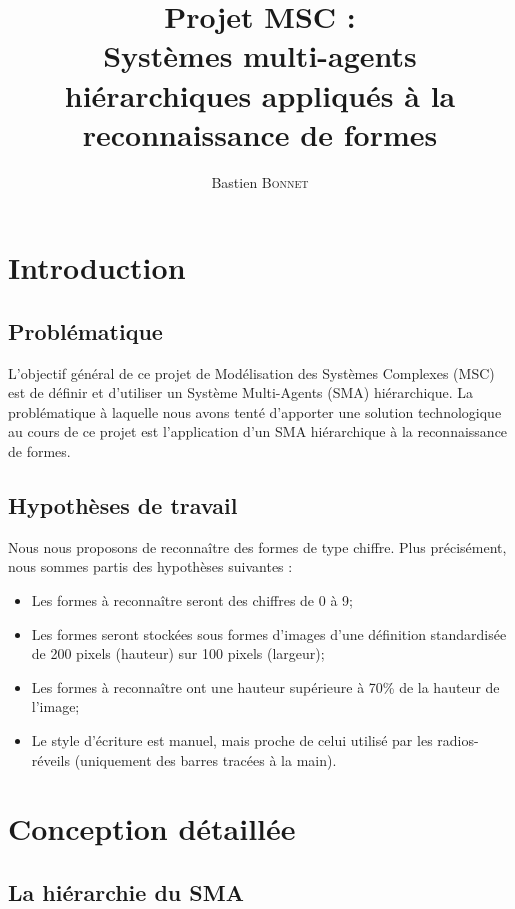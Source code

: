 \documentclass[a4paper,12pt]{report}
\title{Projet MSC : \\ Systèmes multi-agents hiérarchiques appliqués à la reconnaissance de formes}
\author{Bastien \textsc{Bonnet}}
\begin{document}

\maketitle


\tableofcontents

\chapter{Introduction}

\section{Problématique}
L'objectif général de ce projet de Modélisation des Systèmes Complexes (MSC) est de définir et d'utiliser un Système Multi-Agents (SMA) hiérarchique. La problématique à laquelle nous avons tenté d'apporter une solution technologique au cours de ce projet est l'application d'un SMA hiérarchique à la reconnaissance de formes.

\section{Hypothèses de travail}
Nous nous proposons de reconnaître des formes de type chiffre. Plus précisément, nous sommes partis des hypothèses suivantes :
\begin{itemize}
 \item Les formes à reconnaître seront des chiffres de 0 à 9;
 \item Les formes seront stockées sous formes d'images d'une définition standardisée de 200 pixels (hauteur) sur 100 pixels (largeur);
 \item Les formes à reconnaître ont une hauteur supérieure à 70\% de la hauteur de l'image;
 \item Le style d'écriture est manuel, mais proche de celui utilisé par les radios-réveils (uniquement des barres tracées à la main).
\end{itemize}


\chapter{Conception détaillée}
\section{La hiérarchie du SMA}
\end{document}
